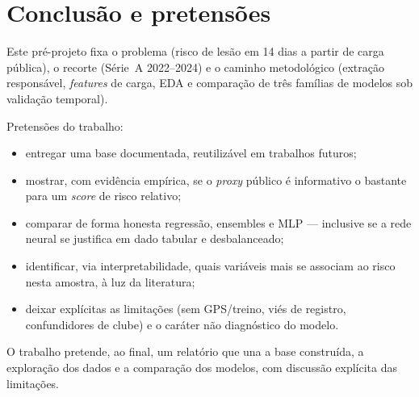 \documentclass[11pt,a4paper]{article}
\begin{document}
\section{Conclusão e pretensões}

Este pré-projeto fixa o problema (risco de lesão em 14 dias a partir de carga pública), o recorte (Série~A 2022--2024) e o caminho metodológico (extração responsável, \textit{features} de carga, EDA e comparação de três famílias de modelos sob validação temporal).

Pretensões do trabalho:
\begin{itemize}
  \item entregar uma base documentada, reutilizável em trabalhos futuros;
  \item mostrar, com evidência empírica, se o \textit{proxy} público é informativo o bastante para um \textit{score} de risco relativo;
  \item comparar de forma honesta regressão, ensembles e MLP --- inclusive se a rede neural se justifica em dado tabular e desbalanceado;
  \item identificar, via interpretabilidade, quais variáveis mais se associam ao risco nesta amostra, à luz da literatura;
  \item deixar explícitas as limitações (sem GPS/treino, viés de registro, confundidores de clube) e o caráter não diagnóstico do modelo.
\end{itemize}

O trabalho pretende, ao final, um relatório que una a base construída, a exploração dos dados e a comparação dos modelos, com discussão explícita das limitações.
\end{document}
